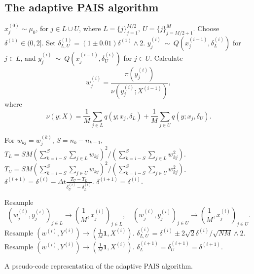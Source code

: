 \documentclass[final]{siamltex}
\begin{document}



\begin{appendix}
\section{The adaptive PAIS algorithm}\label{Sec:App}
\begin{table}[!h]
\begin{mdframed}
\begin{algorithmic}
\STATE $x_j^{(0)} \sim \mu_0$, for $j \in L\cup U$, where $L = \{j\}_{j=1}^{M/2},\ U = \{j\}_{j=M/2+1}^M$.
\STATE Choose $\delta^{(1)} \in (0, 2]$. Set $\delta_{L,U}^{(1)} = (1\pm 0.01)\delta^{(1)}\wedge 2$.
\STATE $y_j^{(i)}~\sim~Q(x_j^{(i-1)},\delta_L^{(i)})$ for $j \in L$, and $y_j^{(i)}~\sim~Q(x_j^{(i-1)},\delta_U^{(i)})$ for $j \in U$.
\STATE Calculate 
\[
	w^{(i)}_j = \frac{\pi(y_j^{(i)})}{\nu(y_j^{(i)};X^{(i-1)})},
\]
where
\[
	\nu(y;X) = \frac{1}{M}\sum_{j\in L} q(y;x_j,\delta_L)+\frac{1}{M}\sum_{j\in U} q(y;x_j,\delta_U).
\]

	\STATE For $w_{kj} = w_j^{(k)}$, $S = n_k - n_{k-1}$,
	\STATE $T_L = SM(\sum_{k=i-S}^S\sum_{j\in L} w_{kj})^2/(\sum_{k=i-S}^S\sum_{j\in L} w_{kj}^2)$.
	\STATE $T_U = SM(\sum_{k=i-S}^S\sum_{j\in U} w_{kj})^2/(\sum_{k=i-S}^S\sum_{j\in U} w_{kj}^2)$.
	\STATE $\delta^{(i+1)} = \delta^{(i)} - \Delta t \displaystyle\frac{T_U - T_L}{\delta_U^{(i)}-\delta_L^{(i)}}$.
\ELSE
	\STATE $\delta^{(i+1)} = \delta^{(i)}$.
\ENDIF

		\STATE Resample 
	\[
		(w_j^{(i)},y_j^{(i)})_{j\in L} \rightarrow (\frac{1}{M}, x_j^{(i)})_{j\in L}, \quad (w_j^{(i)},y_j^{(i)})_{j\in U} \rightarrow (\frac{1}{M}, x_j^{(i)})_{j\in U}.
\]
	\ELSE
		\STATE Resample $(w^{(i)},Y^{(i)}) \rightarrow (\frac{1}{M}\mathbf{1}, X^{(i)})$.
	\ENDIF
	\STATE $\delta_{L,U}^{(i)} = \delta^{(i)} \pm 2\sqrt{2}\delta^{(i)}/\sqrt{NM} \wedge 2$.
\ELSE
		\STATE Resample $(w^{(i)},Y^{(i)}) \rightarrow (\frac{1}{M}\mathbf{1}, X^{(i)})$.
		\STATE $\delta_L^{(i+1)} = \delta_U^{(i+1)} = \delta^{(i+1)}$.
\ENDIF
\ENDFOR
\end{algorithmic}
\end{mdframed}\caption{A pseudo-code representation of the adaptive
  PAIS algorithm.}
\label{tab:adapt}
\end{table}
\end{appendix}
\end{document}
